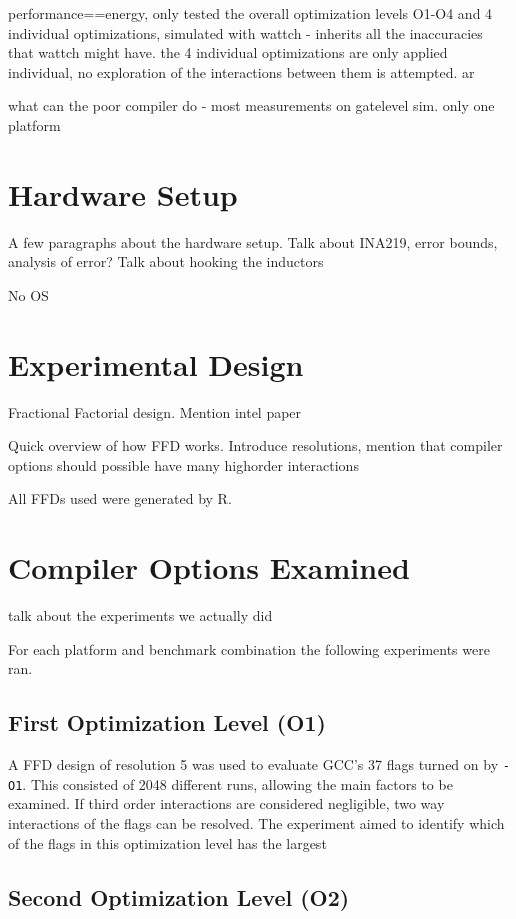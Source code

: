 \documentclass[twocolumn]{article}
\begin{document}
performance==energy, only tested the overall optimization levels O1-O4 and 4 individual optimizations, simulated with wattch - inherits all the inaccuracies that wattch might have. the 4 individual optimizations are only applied individual, no exploration of the interactions between them is attempted. ar

what can the poor compiler do - most measurements on gatelevel sim. only one platform

\section*{Hardware Setup}

A few paragraphs about the hardware setup.
Talk about INA219, error bounds, analysis of error?
Talk about hooking the inductors

No OS

\section*{Experimental Design}

Fractional Factorial design. Mention intel paper

Quick overview of how FFD works. Introduce resolutions, mention that compiler options should possible have many highorder interactions

All FFDs used were generated by R.

\section*{Compiler Options Examined}

talk about the experiments we actually did

For each platform and benchmark combination the following experiments were ran.

\subsection*{First Optimization Level (O1)}

A FFD design of resolution 5 was used to evaluate GCC's 37 flags turned on by \texttt{-O1}. This consisted of 2048 different runs, allowing the main factors to be examined. If third order interactions are considered negligible, two way interactions of the flags can be resolved. The experiment aimed to identify which of the flags in this optimization level has the largest

\subsection*{Second Optimization Level (O2)}
\end{document}
